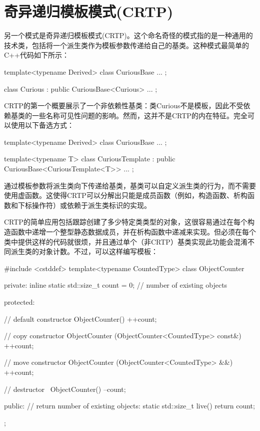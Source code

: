 \section{奇异递归模板模式(CRTP)}

另一个模式是奇异递归模板模式(CRTP)。这个命名奇怪的模式指的是一种通用的技术类，包括将一个派生类作为模板参数传递给自己的基类。这种模式最简单的C++代码如下所示：

\begin{cpp}
template<typename Derived>
class CuriousBase {
	...
};

class Curious : public CuriousBase<Curious> {
	...
};
\end{cpp}

CRTP的第一个概要展示了一个非依赖性基类：类Curious不是模板，因此不受依赖基类的一些名称可见性问题的影响。然而，这并不是CRTP的内在特征。完全可以使用以下备选方式：

\begin{cpp}
template<typename Derived>
class CuriousBase {
	...
};

template<typename T>
class CuriousTemplate : public CuriousBase<CuriousTemplate<T>> {
	...
};
\end{cpp}

通过模板参数将派生类向下传递给基类，基类可以自定义派生类的行为，而不需要使用虚函数。这使得CRTP可以分解出只能是成员函数（例如，构造函数、析构函数和下标操作符）或依赖于派生类标识的实现。

CRTP的简单应用包括跟踪创建了多少特定类类型的对象，这很容易通过在每个构造函数中递增一个整型静态数据成员，并在析构函数中递减来实现。但必须在每个类中提供这样的代码就很烦，并且通过单个（非CRTP）基类实现此功能会混淆不同派生类的对象计数。不过，可以这样编写模板：

\begin{cpp}
#include <cstddef>
template<typename CountedType>
class ObjectCounter {
private:
	inline static std::size_t count = 0; // number of existing objects

protected:
	
	// default constructor
	ObjectCounter() {
		++count;
	}

	// copy constructor
	ObjectCounter (ObjectCounter<CountedType> const&) {
		++count;
	}

	// move constructor
	ObjectCounter (ObjectCounter<CountedType> &&) {
		++count;
	}

	// destructor
	~ObjectCounter() {
		--count;
	}

public:
	// return number of existing objects:
	static std::size_t live() {
		return count;
	}
};
\end{cpp}

